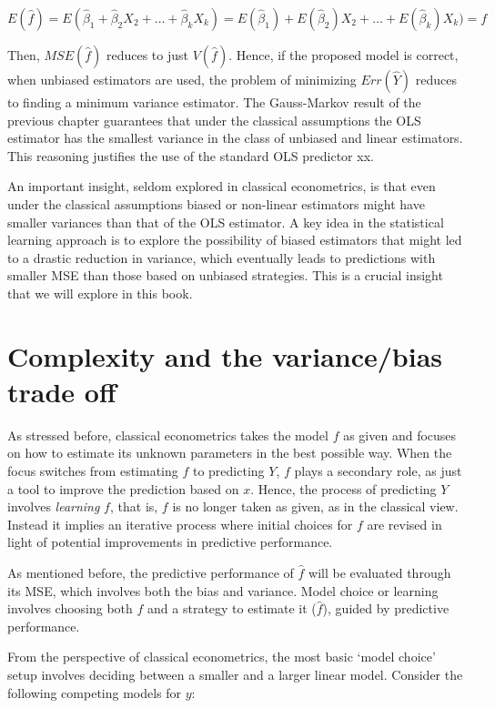 \[E(\hat f)= E(\hat{\beta}_1 + \hat{\beta}_2 X_2 + \dots + \hat{\beta}_k X_k)  = E(\hat{\beta}_1) + E(\hat{\beta}_2) X_2 + \dots + E(\hat{\beta}_k) X_k)  = f\]



Then, $MSE(\hat f)$ reduces to just $V(\hat f)$. Hence, if the proposed model is correct, when unbiased estimators are used, the problem of minimizing  $Err(\hat Y)$ reduces to finding a minimum variance estimator. The Gauss-Markov result of the previous chapter guarantees that under the classical assumptions the OLS estimator has the smallest variance in the class of unbiased and linear estimators. This reasoning justifies the use  of the standard OLS predictor xx.


An important insight, seldom explored in classical econometrics, is that even under the classical assumptions biased or non-linear estimators might have smaller variances than that of the OLS estimator. A key idea in the statistical learning approach is to explore the possibility of biased estimators that might led to a drastic reduction in variance, which eventually leads to predictions with smaller MSE than those based on unbiased strategies. This is a crucial insight that we will explore in this book.

\section{Complexity and the variance/bias trade off}
\label{sec:3_2}

As stressed before, classical econometrics takes the model $f$ as given and focuses on how to estimate its unknown parameters in the best possible way. When the focus switches from estimating $f$ to predicting $Y$, $f$ plays a secondary role, as just a tool to improve the prediction based on $x$. Hence, the process of predicting $Y$ involves \emph{learning} $f$, that is, $f$ is no longer taken as given, as in the classical view. Instead it implies an  iterative process where initial choices for $f$ are revised in light of potential improvements in predictive performance.

As mentioned before, the predictive performance of $\hat f$ will be evaluated through its MSE, which involves both the bias and variance. Model choice or learning involves choosing both $f$ and a strategy to estimate it ($\hat f$), guided by predictive performance. 

From the perspective of classical econometrics, the most basic `model choice' setup involves deciding between a smaller and a larger linear model. Consider the following competing models for $y$:


